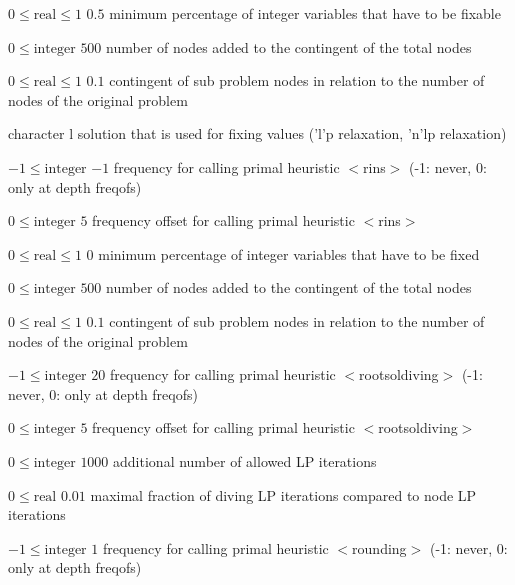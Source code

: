 %
{$0\leq\textrm{real}\leq1$}%
{$0.5$}%
{minimum percentage of integer variables that have to be fixable}%
{}

%
{$0\leq\textrm{integer}$}%
{$500$}%
{number of nodes added to the contingent of the total nodes}%
{}

%
{$0\leq\textrm{real}\leq1$}%
{$0.1$}%
{contingent of sub problem nodes in relation to the number of nodes of the original problem}%
{}

%
{character}%
{l}%
{solution that is used for fixing values ('l'p relaxation, 'n'lp relaxation)}%
{}

%
{$-1\leq\textrm{integer}$}%
{$-1$}%
{frequency for calling primal heuristic $<$rins$>$ (-1: never, 0: only at depth freqofs)}%
{}

%
{$0\leq\textrm{integer}$}%
{$5$}%
{frequency offset for calling primal heuristic $<$rins$>$}%
{}

%
{$0\leq\textrm{real}\leq1$}%
{$0$}%
{minimum percentage of integer variables that have to be fixed}%
{}

%
{$0\leq\textrm{integer}$}%
{$500$}%
{number of nodes added to the contingent of the total nodes}%
{}

%
{$0\leq\textrm{real}\leq1$}%
{$0.1$}%
{contingent of sub problem nodes in relation to the number of nodes of the original problem}%
{}

%
{$-1\leq\textrm{integer}$}%
{$20$}%
{frequency for calling primal heuristic $<$rootsoldiving$>$ (-1: never, 0: only at depth freqofs)}%
{}

%
{$0\leq\textrm{integer}$}%
{$5$}%
{frequency offset for calling primal heuristic $<$rootsoldiving$>$}%
{}

%
{$0\leq\textrm{integer}$}%
{$1000$}%
{additional number of allowed LP iterations}%
{}

%
{$0\leq\textrm{real}$}%
{$0.01$}%
{maximal fraction of diving LP iterations compared to node LP iterations}%
{}

%
{$-1\leq\textrm{integer}$}%
{$1$}%
{frequency for calling primal heuristic $<$rounding$>$ (-1: never, 0: only at depth freqofs)}%
{}

